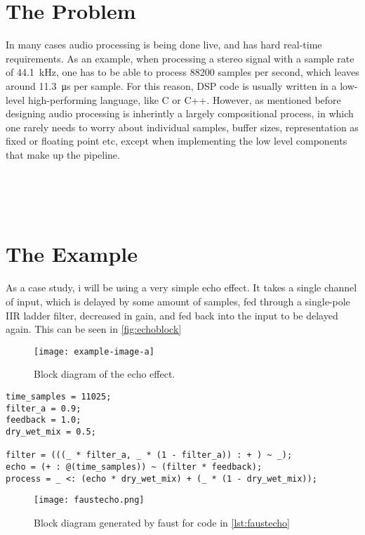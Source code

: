 \section{The Problem}

In many cases audio processing is being done live, and has hard real-time requirements. As an example, when processing a stereo signal with a sample rate of \SI{44.1}{kHz}, one has to be able to process \num{88200} samples per second, which leaves around \SI{11.3}{\micro\second} per sample. For this reason, DSP code is usually written in a low-level high-performing language, like C or C++. However, as mentioned before designing audio processing is inherintly a largely compositional process, in which one rarely needs to worry about individual samples, buffer sizes, representation as fixed or floating point etc, except when implementing the low level components that make up the pipeline.


 \\
 \\
 \\

\section{The Example}

As a case study, i will be using a very simple echo effect. It takes a single channel of input, which is delayed by some amount of samples, fed through a single-pole IIR ladder filter, decreased in gain, and fed back into the input to be delayed again. This can be seen in \autoref{fig:echoblock}

\begin{figure}
    \centering
    \texttt{[image: example-image-a]}
    \caption{Block diagram of the echo effect.}
    \label{fig:echoblock}
\end{figure}

\begin{lstlisting}[language=faust,label=lst:faustecho,caption={
    Simple echo effect in faust, with time control, a 1-pole IIR filter, feedback gain and a dry/wet mix control. Paste into \url{https://faustide.grame.fr} to run the example.
}]
time_samples = 11025;
filter_a = 0.9;
feedback = 1.0; 
dry_wet_mix = 0.5;

filter = (((_ * filter_a, _ * (1 - filter_a)) : + ) ~ _);
echo = (+ : @(time_samples)) ~ (filter * feedback);
process = _ <: (echo * dry_wet_mix) + (_ * (1 - dry_wet_mix));
\end{lstlisting}

\begin{figure}
    \centering
    \def\svgwidth{\columnwidth}
    \texttt{[image: faustecho.png]}
    \caption{Block diagram generated by faust for code in \autoref{lst:faustecho}}
    \label{fig:faustecho}
\end{figure}




